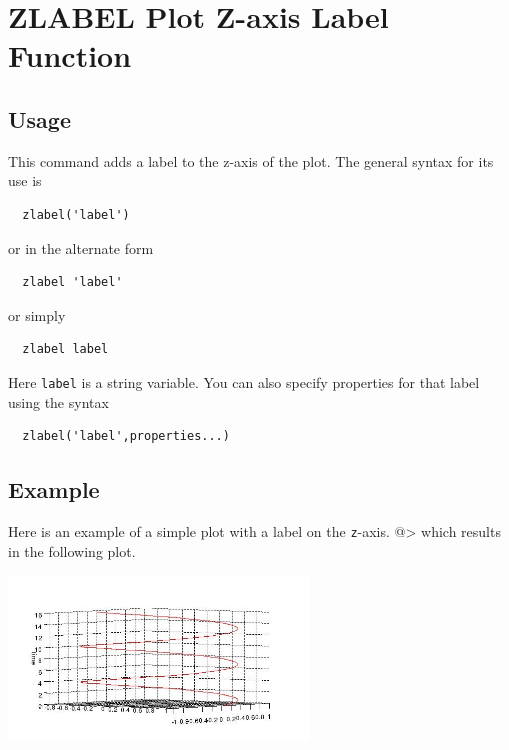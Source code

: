 \section{ZLABEL Plot Z-axis Label Function}

\subsection{Usage}

This command adds a label to the z-axis of the plot.  The general syntax
for its use is
\begin{verbatim}
  zlabel('label')
\end{verbatim}
or in the alternate form
\begin{verbatim}
  zlabel 'label'
\end{verbatim}
or simply
\begin{verbatim}
  zlabel label
\end{verbatim}
Here \verb|label| is a string variable.  You can also specify properties
for that label using the syntax
\begin{verbatim}
  zlabel('label',properties...) 
\end{verbatim}
\subsection{Example}

Here is an example of a simple plot with a label on the \verb|z|-axis.
@>
which results in the following plot.


\centerline{\includegraphics[width=8cm]{zlabel1}}

